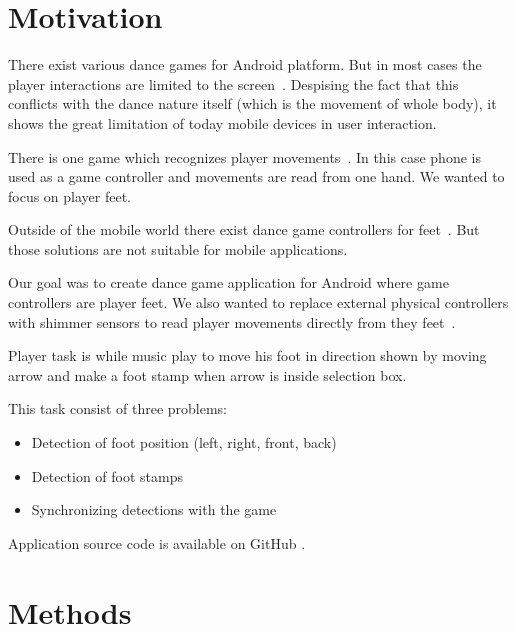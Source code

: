 \documentclass[conference]{IEEEtran}
\begin{document}
%
\IEEEpeerreviewmaketitle



\section{Motivation}

There exist various dance games for Android platform.
But in most cases the player interactions are limited to the screen~\cite{DanceGamesList}.
Despising the fact that this conflicts with the dance nature itself (which is the movement of whole body), it shows the great limitation of today mobile devices in user interaction.

There is one game which recognizes player movements~\cite{JustDanceNow}.
In this case phone is used as a game controller and movements are read from one hand.
We wanted to focus on player feet.

Outside of the mobile world there exist dance game controllers for feet~\cite{suzuki2001dance, openiano1992foot}. But those solutions are not suitable for mobile applications.

Our goal was to create dance game application for Android where game controllers are player feet.
We also wanted to replace external physical controllers with shimmer sensors to read player movements directly from they feet~\cite{Shimmer}.

Player task is while music play to move his foot in direction shown by moving arrow and make a foot stamp when arrow is inside selection box.

This task consist of three problems:
\begin{itemize}
    \item Detection of foot position (left, right, front, back)
    \item Detection of foot stamps
    \item Synchronizing detections with the game
\end{itemize}
Application source code is available on GitHub \cite{Application}.

\section{Methods}
\end{document}
